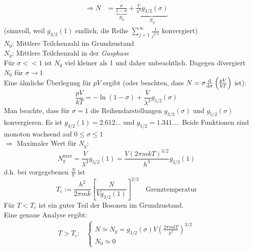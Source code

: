 \begin{enumerate}[A)]
\begin{enumerate}[i)]
\begin{equation}
\begin{split}
                \Rightarrow N &= \underbrace{\frac{\sigma}{1 - \sigma}}_{N_0} + \underbrace{\frac{V}{\lambda^3} g_{3/2} (\sigma)}_{N_g}
            \end{split}
        \end{equation}
        (sinnvoll, weil $g_{3/2}(1)$ endlich; die Reihe $\sum_{j=1}^\infty \frac{1}{j^{3/2}}$ konvergiert) \\
        $N_0$: Mittlere Teilchenzahl im Grundzustand \\
        $N_g$: Mittlere Teilchenzahl in der \emph{Gasphase} \\
        Für $\sigma << 1$ ist $N_0$ viel kleiner als 1 und daher unbeachtlich. Dagegen divergiert $N_0$ für $\sigma \to 1$ \\
        Eine ähnliche Überlegung für $p V$ ergibt (oder beachten, dass $N = \sigma \frac{\mathrm{d}}{\mathrm{d} \sigma} \left( \frac{p V}{k T} \right) $ ist):
        \begin{equation}
            \frac{p V}{k T} = - \ln(1-\sigma) + \frac{V}{\lambda^3} g_{5/2}(\sigma)
        \end{equation}
        Man beachte, dass für $\sigma = 1$ die Reihendarstellungen $g_{3/2}(\sigma)$ und $g_{5/2}(\sigma)$ konvergieren. Es ist $g_{3/2}(1) = 2.612\ldots$
        und $g_{5/2}=1.341\ldots$. Beide Funktionen sind monoton wachsend auf $0 \leq \sigma \leq 1$ \\
        $\Rightarrow$ Maximaler Wert für $N_g$:
        \begin{equation}
            N_g^\text{max} = \frac{V}{\lambda^3} g_{3/2}(1) = \frac{V (2 \pi m k T)^{3/2}}{h^3} g_{3/2}(1)
        \end{equation}
        d.h. bei vorgegebenen $\frac{N}{V}$ ist
        \begin{equation}
            T_c := \frac{h^2}{2 \pi m k} \left[ \frac{N}{V g_{3/2}(1)} \right]^{2/3} \quad \text{Grenztemperatur}
        \end{equation}
        Für $T<T_c$ ist ein guter Teil der Bosonen im Grundzustand. \\
        Eine genaue Analyse ergibt:
        \begin{equation}
            \begin{split}
                T > T_c: &
                \begin{cases}
                    N \simeq N_g = g_{3/2}(\sigma) V \left( \frac{2 \pi m k T}{h^2} \right)^{3/2} \\
                    N_0 \simeq 0
                \end{cases} \\

\end{split}
\end{equation}
\end{enumerate}
\end{enumerate}
